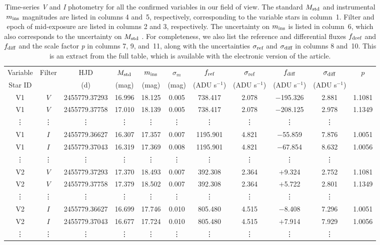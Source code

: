 \documentclass[journal]{rmaa}
\newcommand{\1}{\'{\i}}
\def\Mstd{$M_{\mbox{\scriptsize std}}$ }
\def\mins{$m_{\mbox{\scriptsize ins}}$ }
\def\fdif{$f_{\mbox{\scriptsize diff}}$ }
\def\fref{$f_{\mbox{\scriptsize dref}}$ }
\def\sref{$\sigma_{\mbox{\scriptsize ref}}$ }
\def\sdiff{$\sigma_{\mbox{\scriptsize diff}}$ }
\begin{document}
\begin{table*}
\footnotesize
\caption{Time-series \textit{V} and \textit{I} photometry for all the confirmed variables in our
field of view. The standard \Mstd and
instrumental \mins magnitudes are listed in columns 4 and~5,
respectively, corresponding to the variable stars in column~1. Filter and epoch of
mid-exposure are listed in columns 2 and 3, respectively. The uncertainty on
\mins is listed in column~6, which also corresponds to the
uncertainty on \Mstd. For completeness, we also list the
reference and differential fluxes \fref
and \fdif and the scale factor \lowercase{\textit{p}}
in columns 7, 9, and~11, along with the uncertainties \sref
and \sdiff in columns 8 and~10. This is an extract from
the full table, which is available with the electronic version of the article.
         }
\centering
\begin{tabular}{ccccccccccc}
\hline
Variable &Filter & HJD & $M_{\mbox{\scriptsize std}}$ &
$m_{\mbox{\scriptsize ins}}$
& $\sigma_{m}$ & $f_{\mbox{\scriptsize ref}}$ & $\sigma_{\mbox{\scriptsize ref}}$ &
$f_{\mbox{\scriptsize diff}}$ &
$\sigma_{\mbox{\scriptsize diff}}$ & $p$ \\
Star ID  &    & (d) & (mag)     & (mag)   & (mag) & (ADU s$^{-1}$) &(ADU s$^{-1}$)
               &(ADU s$^{-1}$)  &(ADU s$^{-1}$)    & \\
\hline
V1 &$V$ &2455779.37293& 16.996& 18.125 & 0.005 &  738.417 & 2.078 & $-$195.326&2.881&1.1081\\
V1 &$V$ &2455779.37758& 17.010& 18.139 & 0.005 &  738.417 & 2.078 & $-$208.125&2.978&1.1349\\
\vdots   &  \vdots  & \vdots & \vdots & \vdots & \vdots   & \vdots & \vdots  & \vdots&\vdots \\
V1 &$I$ &2455779.36627& 16.307& 17.357& 0.007&   1195.901&  4.821& $-$55.859&  7.876& 1.0051\\
V1 &$I$ &2455779.37043& 16.319& 17.369& 0.008&   1195.901&  4.821& $-$67.854&  8.632& 1.0056\\
\vdots   &  \vdots  & \vdots & \vdots & \vdots & \vdots   & \vdots & \vdots  & \vdots&\vdots \\
V2 &$V$&2455779.37293 &17.370& 18.493& 0.007&    392.308&  2.364& $+$9.324 &2.752& 1.1081\\
V2 &$V$&2455779.37758 &17.379& 18.502& 0.007&    392.308&  2.364& $+$5.722 &2.801& 1.1349\\
\vdots   &  \vdots  & \vdots & \vdots & \vdots & \vdots   & \vdots & \vdots  & \vdots&\vdots \\
V2 &$I$&2455779.36627& 16.699&  17.746&  0.010&  805.480&   4.515 &$-$8.408 & 7.296& 1.0051\\
V2 &$I$&2455779.37043& 16.677&  17.724&  0.010&  805.480&   4.515 &$+$7.914 & 7.929& 1.0056\\
\vdots   &  \vdots  & \vdots & \vdots & \vdots & \vdots   & \vdots & \vdots  & \vdots&\vdots \\
\hline
\end{tabular}
\label{tab:vi_phot}
\end{table*}
\end{document}
